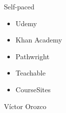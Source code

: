 \documentclass[aspectratio=169]{beamer}
\begin{document}
\begin{frame}[fragile]{Self-paced}
    
    \begin{itemize}
        \item Udemy
        \item Khan Academy
        \item Pathwright
        \item Teachable
        \item CourseSites
    \end{itemize}
    
\end{frame}


\begin{frame}{Víctor Orozco}
\begin{columns}[T] %
	

\end{columns}
\end{frame}
\end{document}
